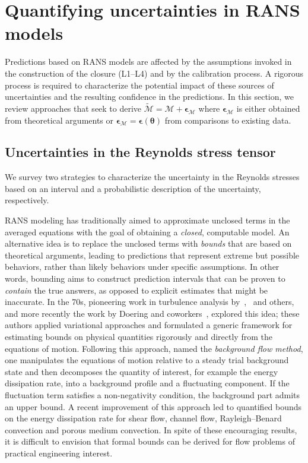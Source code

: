 \documentclass[a4paper]{ar-1col}
\begin{document}
\section{Quantifying uncertainties in RANS models}

Predictions based on RANS models are   affected by the assumptions invoked in the construction of the closure (L1--L4) and by the calibration process. A
rigorous   process is required to characterize the potential impact of these sources of uncertainties and the resulting confidence in the predictions.
In this section, we review approaches that seek to derive $ \widetilde{ \mathcal M} = \mathcal M + \bm{\epsilon}_{ \mathcal M}$
where $\bm{\epsilon}_{ \mathcal M}$ is either obtained from theoretical arguments or $\bm{\epsilon}_{ \mathcal M} = \bm{\epsilon}(\bm{\theta})$ from comparisons to existing data.


\subsection{Uncertainties in the Reynolds stress tensor}

We survey two strategies to characterize the uncertainty in the Reynolds stresses based on an interval and a probabilistic description of the uncertainty, respectively.

RANS modeling has traditionally aimed to approximate unclosed terms in the averaged equations with the goal of obtaining
 a {\it closed}, computable  model. An alternative idea is to replace the unclosed terms with {\it bounds} that are 
 based on theoretical arguments, leading to predictions that represent extreme but possible behaviors, rather than likely behaviors under specific assumptions. In other words, bounding aims to construct prediction intervals that 
 can be proven to {\it contain} the true answers, as opposed to 
  explicit estimates that might be inaccurate. In the 70s, pioneering work in turbulence analysis by~\citet{howard1972bounds},~\citet{busse1970bounds} and others, and more recently the work by Doering and coworkers~\citep{doering1994variational},  explored this idea;
 these authors applied variational approaches and formulated a generic framework for estimating bounds on
 physical quantities rigorously and directly from the equations of motion. Following this approach, named the {\it background flow method},
 one manipulates the equations of motion relative to a steady trial background state and
 then decomposes the quantity of interest, for example the energy dissipation rate, into a background profile
 and a fluctuating component. If the fluctuation term satisfies a non-negativity condition, the background part admits an upper bound.
 A recent improvement of this approach \citep{seis2015scaling} led to quantified bounds on the  energy dissipation rate for 
 shear flow, channel flow, Rayleigh--Benard convection and porous medium convection.
 In spite of these encouraging results, it is difficult to envision that formal bounds can be derived for  flow problems of practical
 engineering interest.
\end{document}
